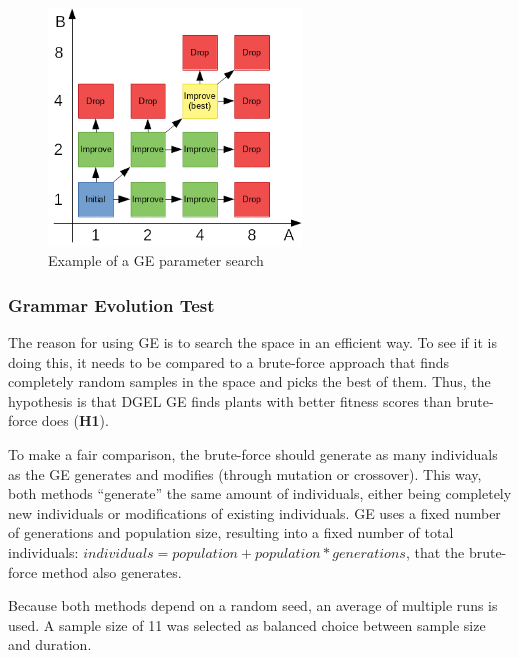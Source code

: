 \begin{figure}
    \centering
    \includegraphics[width=0.6\textwidth]{figures/parameter-search}
    \caption[Example of a GE parameter search]{Example of a \gls{GE} parameter search}
    \label{fig:parameter-search}
\end{figure}

\subsubsection{Grammar Evolution Test}
The reason for using \gls{GE} is to search the space in an efficient way.
To see if it is doing this, it needs to be compared to a brute-force approach that finds completely random samples in the space and picks the best of them.
Thus, the hypothesis is that \gls{DGEL} \gls{GE} finds plants with better fitness scores than brute-force does (\textbf{H1}).

To make a fair comparison, the brute-force should generate as many individuals as the \gls{GE} generates and modifies (through mutation or crossover).
This way, both methods ``generate'' the same amount of individuals, either being completely new individuals or modifications of existing individuals.
\gls{GE} uses a fixed number of generations and population size, resulting into a fixed number of total individuals: $individuals = population + population * generations$, that the brute-force method also generates.

Because both methods depend on a random seed, an average of multiple runs is used.
A sample size of 11 was selected as balanced choice between sample size and duration.

